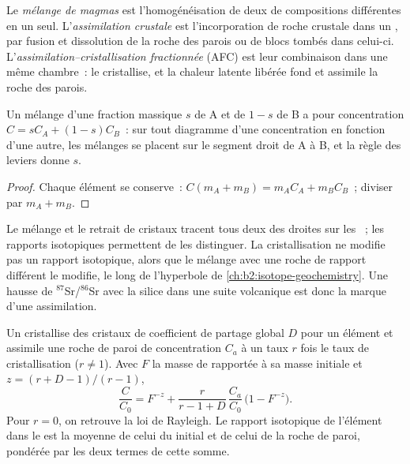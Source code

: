 \begin{definition}
\label{def:b2:magmatic-differentiation:open}
Le \emph{mélange de magmas} est l'homogénéisation de deux  de
compositions différentes en un seul. L'\emph{assimilation crustale} est
l'incorporation de roche crustale dans un , par fusion
et dissolution de la roche des parois ou de blocs tombés dans celui-ci.
L'\emph{assimilation--cristallisation fractionnée}
(AFC) est leur combinaison dans une même chambre~: le 
cristallise, et la chaleur latente libérée fond et assimile la roche des parois.
\end{definition}

\begin{proposition}\label{prop:b2:magmatic-differentiation:mixing}
Un mélange d'une fraction massique $s$ de  A et de $1-s$ de  B a pour concentration
$C = sC_A + (1-s)C_B$~: sur tout diagramme d'une concentration en fonction d'une
autre, les mélanges se placent sur le segment droit de A à B, et la règle des leviers donne
$s$.
\end{proposition}

\begin{proof}
Chaque élément se conserve~: $C(m_A + m_B) = m_AC_A + m_BC_B$~; diviser par $m_A + m_B$.
\end{proof}

Le mélange et le retrait de cristaux tracent tous deux des droites sur les ~; les rapports
isotopiques permettent de les distinguer. La cristallisation ne modifie pas un rapport isotopique, alors que le
mélange avec une roche de rapport différent le modifie, le long de l'hyperbole de
\cref{ch:b2:isotope-geochemistry}. Une hausse de $^{87}$Sr/$^{86}$Sr avec la silice dans une suite
volcanique est donc la marque d'une assimilation.

\begin{proposition}
\label{prop:b2:magmatic-differentiation:afc}
Un  cristallise des cristaux de coefficient de partage global $D$ pour un élément
et assimile une roche de paroi de concentration $C_a$ à un taux $r$ fois le taux de
cristallisation ($r \ne 1$). Avec $F$ la masse de  rapportée à sa masse initiale
et $z = (r + D - 1)/(r - 1)$,
\[
\frac{C}{C_0} = F^{-z} + \frac{r}{r - 1 + D}\,\frac{C_a}{C_0}\,\bigl(1 - F^{-z}\bigr).
\]
Pour $r = 0$, on retrouve la loi de Rayleigh. Le rapport isotopique de l'élément dans le 
est la moyenne de celui du  initial et de celui de la roche de paroi, pondérée par les deux
termes de cette somme.
\end{proposition}

